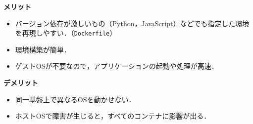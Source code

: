\begin{frame}[t]{\ftitle}
    \begin{minipage}[t]{.48\textwidth}
        \textbf{\cmark メリット}
        \begin{itemize}
            \item バージョン依存が激しいもの（Python，JavaScript）などでも指定した環境を再現しやすい．（\texttt{Dockerfile}）
            \item 環境構築が簡単．
            \item ゲストOSが不要なので，アプリケーションの起動や処理が高速．
        \end{itemize}
    \end{minipage}
    \begin{minipage}[t]{.48\textwidth}
        \textbf{\xmark デメリット}
        \begin{itemize}
            \item 同一基盤上で異なるOSを動かせない．
            \item ホストOSで障害が生じると，すべてのコンテナに影響が出る．
        \end{itemize}
    \end{minipage}\\
    \vspace{1em}
    \hfill\hyperlink{sec:準仮想化と完全仮想化}{}
\end{frame}